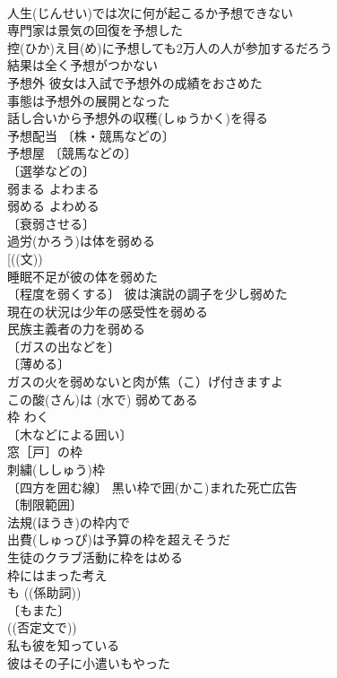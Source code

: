 \documentclass[8pt]{extreport}
\begin{document}
\begin{CJK}{UTF8}{min}
\\	人生(じんせい)では次に何が起こるか予想できない 
\\	専門家は景気の回復を予想した 
\\	控(ひか)え目(め)に予想しても2万人の人が参加するだろう 
\\	結果は全く予想がつかない 
\\	予想外 彼女は入試で予想外の成績をおさめた 
\\	事態は予想外の展開となった 
\\	話し合いから予想外の収穫(しゅうかく)を得る 
\\	予想配当 〔株・競馬などの〕
\\	予想屋 〔競馬などの〕
\\	〔選挙などの〕
\\	弱まる	よわまる	
\\	弱める	よわめる	
\\	〔衰弱させる〕
\\	過労(かろう)は体を弱める 
\\	[((文)) 
\\	睡眠不足が彼の体を弱めた 
\\	〔程度を弱くする〕 彼は演説の調子を少し弱めた 
\\	現在の状況は少年の感受性を弱める 
\\	民族主義者の力を弱める 
\\	〔ガスの出などを〕
\\	〔薄める〕
\\	ガスの火を弱めないと肉が焦（こ）げ付きますよ 
\\	この酸(さん)は (水で) 弱めてある 
\\	枠	わく	
\\	〔木などによる囲い〕
\\	窓［戸］の枠 
\\	刺繍(ししゅう)枠 
\\	〔四方を囲む線〕 黒い枠で囲(かこ)まれた死亡広告 
\\	〔制限範囲〕
\\	法規(ほうき)の枠内で 
\\	出費(しゅっぴ)は予算の枠を超えそうだ 
\\	生徒のクラブ活動に枠をはめる 
\\	枠にはまった考え 
\\	も	((係助詞)) 
\\	〔もまた〕
\\	((否定文で)) 
\\	私も彼を知っている 
\\	彼はその子に小遣いもやった 

\end{CJK}
\end{document}
